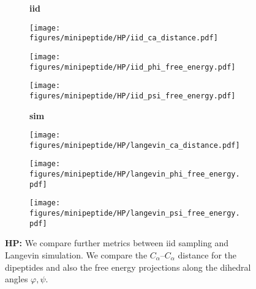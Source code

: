 \begin{figure}
    \centering
    \begin{minipage}{\textwidth}
        \centering
        \begin{subfigure}[c]{0.08\textwidth}
            \textbf{iid}
        \end{subfigure}
        \begin{subfigure}[c]{0.2\textwidth}
            \centering
            \texttt{[image: figures/minipeptide/HP/iid\_ca\_distance.pdf]}            
        \end{subfigure}
        \hspace{0.5cm}
        \begin{subfigure}[c]{0.2\textwidth}
            \centering
            \texttt{[image: figures/minipeptide/HP/iid\_phi\_free\_energy.pdf]}
        \end{subfigure}
        \hspace{0.5cm}
        \begin{subfigure}[c]{0.2\textwidth}
            \centering
            \texttt{[image: figures/minipeptide/HP/iid\_psi\_free\_energy.pdf]}
        \end{subfigure}
    \end{minipage}
    \vspace{0.5cm}
    \begin{minipage}{\textwidth}
        \centering
        \begin{subfigure}[c]{0.08\textwidth}
            \vspace{-0.5cm}
            \textbf{sim}
        \end{subfigure}
        \begin{subfigure}[c]{0.2\textwidth}
            \centering
            \texttt{[image: figures/minipeptide/HP/langevin\_ca\_distance.pdf]}
        \end{subfigure}
        \hspace{0.5cm}
        \begin{subfigure}[c]{0.2\textwidth}
            \centering
            \texttt{[image: figures/minipeptide/HP/langevin\_phi\_free\_energy.pdf]}
        \end{subfigure}
        \hspace{0.5cm}
        \begin{subfigure}[c]{0.2\textwidth}
            \centering
            \texttt{[image: figures/minipeptide/HP/langevin\_psi\_free\_energy.pdf]}
        \end{subfigure}
    \end{minipage}
    \caption{\textbf{HP:} We compare further metrics between iid sampling and Langevin simulation. We compare the $C_\alpha$--$C_\alpha$ distance for the dipeptides and also the free energy projections along the dihedral angles $\varphi, \psi$.}
    \label{fig:minipeptide-hp-more-metrics}
\end{figure}

